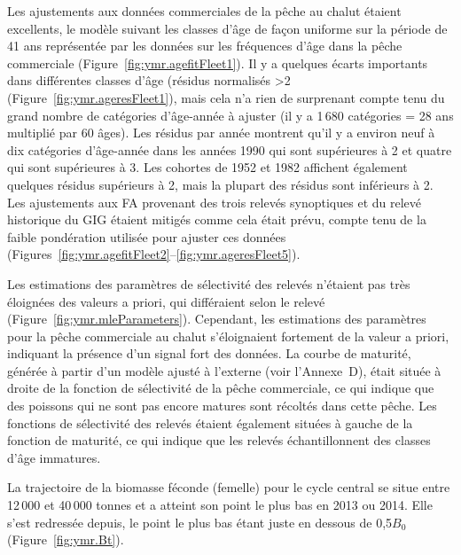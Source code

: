 \documentclass[11pt]{book}
\newcommand{\AppBio}{Annexe~D}
\begin{document}
Les ajustements aux donn\'{e}es commerciales de la p\^{e}che au chalut \'{e}taient excellents, le mod\`{e}le suivant les classes d'\^{a}ge de fa\c{c}on uniforme sur la p\'{e}riode de 41 ans repr\'{e}sent\'{e}e par les donn\'{e}es sur les fr\'{e}quences d'\^{a}ge dans la p\^{e}che commerciale (Figure~\ref{fig:ymr.agefitFleet1}).
Il y a quelques \'{e}carts importants dans diff\'{e}rentes classes d'\^{a}ge (r\'{e}sidus normalis\'{e}s >2 (Figure~\ref{fig:ymr.ageresFleet1}), mais cela n'a rien de surprenant compte tenu du grand nombre de cat\'{e}gories d'\^{a}ge-ann\'{e}e \`{a} ajuster (il y a 1\,680 cat\'{e}gories = 28 ans multipli\'{e} par 60 \^{a}ges).
Les r\'{e}sidus par ann\'{e}e montrent qu'il y a environ neuf \`{a} dix cat\'{e}gories d'\^{a}ge-ann\'{e}e dans les ann\'{e}es 1990 qui sont sup\'{e}rieures \`{a} 2 et quatre qui sont sup\'{e}rieures \`{a} 3.
Les cohortes de 1952 et 1982 affichent \'{e}galement quelques r\'{e}sidus sup\'{e}rieurs \`{a} 2, mais la plupart des r\'{e}sidus sont inf\'{e}rieurs \`{a} 2.
Les ajustements aux FA provenant des trois relev\'{e}s synoptiques et du relev\'{e} historique du GIG \'{e}taient mitig\'{e}s comme cela \'{e}tait pr\'{e}vu, compte tenu de la faible pond\'{e}ration utilis\'{e}e pour ajuster ces donn\'{e}es (Figures~\ref{fig:ymr.agefitFleet2}--\ref{fig:ymr.ageresFleet5}).

Les estimations des param\`{e}tres de s\'{e}lectivit\'{e} des relev\'{e}s n'\'{e}taient pas tr\`{e}s \'{e}loign\'{e}es des valeurs a priori, qui diff\'{e}raient selon le relev\'{e} (Figure~\ref{fig:ymr.mleParameters}).
Cependant, les estimations des param\`{e}tres pour la p\^{e}che commerciale au chalut s'\'{e}loignaient fortement de la valeur a priori, indiquant la pr\'{e}sence d'un signal fort des donn\'{e}es. 
La courbe de maturit\'{e}, g\'{e}n\'{e}r\'{e}e \`{a} partir d'un mod\`{e}le ajust\'{e} \`{a} l'externe (voir l'\AppBio), \'{e}tait situ\'{e}e \`{a} droite de la fonction de s\'{e}lectivit\'{e} de la p\^{e}che commerciale, ce qui indique que des poissons qui ne sont pas encore matures sont r\'{e}colt\'{e}s dans cette p\^{e}che.
Les fonctions de s\'{e}lectivit\'{e} des relev\'{e}s \'{e}taient \'{e}galement situ\'{e}es \`{a} gauche de la fonction de maturit\'{e}, ce qui indique que les relev\'{e}s \'{e}chantillonnent des classes d'\^{a}ge immatures.

La trajectoire de la biomasse f\'{e}conde (femelle) pour le cycle central se situe entre 12\,000 et 40\,000 tonnes et a atteint son point le plus bas en 2013 ou 2014. Elle s'est redress\'{e}e depuis, le point le plus bas \'{e}tant juste en dessous de 0,5$B_0$ (Figure~\ref{fig:ymr.Bt}).
\end{document}
